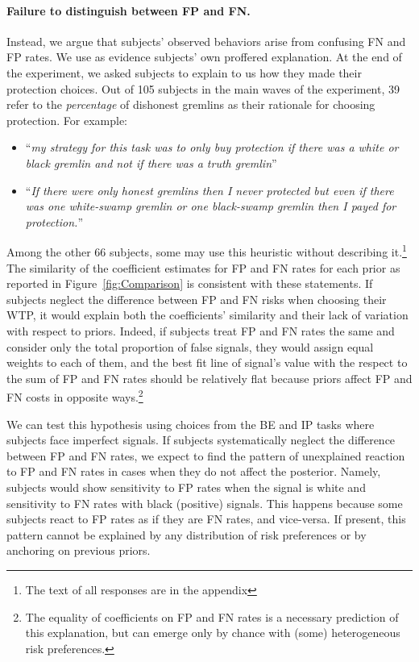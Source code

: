 \documentclass[12pt,a4paper]{article}
\begin{document}
\paragraph{Failure to distinguish between FP and FN.} Instead, we argue that subjects' observed behaviors arise from confusing FN and FP rates. We use as evidence subjects' own proffered explanation.  At the end of the experiment, we asked subjects to explain to us how they made their protection choices.  Out of 105 subjects in the main waves of the experiment, 39 refer to the \textit{percentage} \normalfont  of dishonest gremlins as their rationale for choosing protection. For example:
\begin{itemize}
	\item ``\emph{my strategy for this task was to only buy protection if there was a white or black gremlin and not if there was a truth gremlin}''
	\item ``\emph{If there were only honest gremlins then I never protected but even if there was one white-swamp gremlin or one black-swamp gremlin then I payed for protection.}''
\end{itemize}

Among the other 66 subjects, some may use this heuristic without describing it.\footnote{The text of all responses are in the appendix} The similarity of the coefficient estimates for FP and FN rates for each prior as reported in Figure~\ref{fig:Comparison} is consistent with these statements. If subjects neglect the difference between FP and FN risks when choosing their WTP, it would explain both the coefficients' similarity and their lack of variation with respect to priors. Indeed, if subjects treat FP and FN rates the same and consider only the total proportion of false signals, they would assign equal weights to each of them, and the best fit line of signal's value with the respect to the sum of FP and FN rates should be relatively flat because priors affect FP and FN costs in opposite ways.\footnote{The equality of coefficients on FP and FN rates is a necessary prediction of this explanation, but can emerge only by chance with (some) heterogeneous risk preferences.}


We can test this hypothesis using choices from the BE and IP tasks where subjects face imperfect signals. If subjects systematically neglect the difference between FP and FN rates, we expect to find the pattern of unexplained reaction to FP and FN rates in cases when they do not affect the posterior. Namely, subjects would show sensitivity to FP rates when the signal is white and sensitivity to FN rates with black (positive) signals. This happens because some subjects react to FP rates as if they are FN rates, and vice-versa. If present, this pattern cannot be explained by any distribution of risk preferences or by anchoring on previous priors.  
\end{document}
